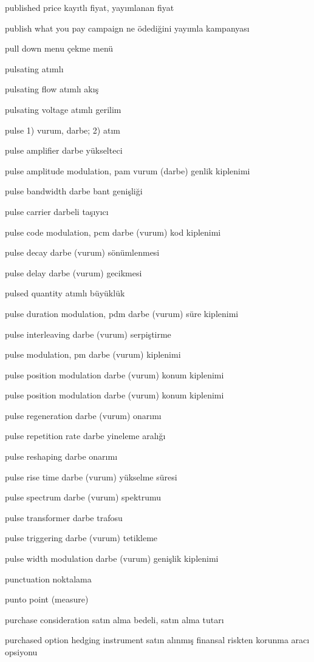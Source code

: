 \documentclass[12pt,fleqn]{article}\usepackage{../../common}
\begin{document}
published price kayıtlı fiyat, yayımlanan fiyat

publish what you pay campaign ne ödediğini yayımla kampanyası

pull down menu çekme menü

pulsating atımlı

pulsating flow atımlı akış

pulsating voltage atımlı gerilim

pulse 1) vurum, darbe; 2) atım

pulse amplifier darbe yükselteci

pulse amplitude modulation, pam vurum (darbe) genlik kiplenimi

pulse bandwidth darbe bant genişliği

pulse carrier darbeli taşıyıcı

pulse code modulation, pcm darbe (vurum) kod kiplenimi

pulse decay darbe (vurum) sönümlenmesi

pulse delay darbe (vurum) gecikmesi

pulsed quantity atımlı büyüklük

pulse duration modulation, pdm darbe (vurum) süre kiplenimi

pulse interleaving darbe (vurum) serpiştirme

pulse modulation, pm darbe (vurum) kiplenimi

pulse position modulation darbe (vurum) konum kiplenimi

pulse position modulation darbe (vurum) konum kiplenimi

pulse regeneration darbe (vurum) onarımı

pulse repetition rate darbe yineleme aralığı

pulse reshaping darbe onarımı

pulse rise time darbe (vurum) yükselme süresi

pulse spectrum darbe (vurum) spektrumu

pulse transformer darbe trafosu

pulse triggering darbe (vurum) tetikleme

pulse width modulation darbe (vurum) genişlik kiplenimi

punctuation noktalama

punto point (measure)

purchase consideration satın alma bedeli, satın alma tutarı

purchased option hedging instrument satın alınmış finansal riskten korunma aracı opsiyonu
\end{document}
